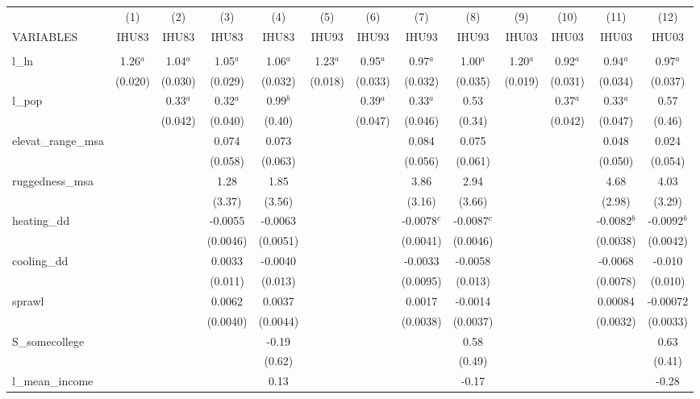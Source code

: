 \documentclass[]{article}
\begin{document}
\begin{tabular}{lcccccccccccc} \hline
 & (1) & (2) & (3) & (4) & (5) & (6) & (7) & (8) & (9) & (10) & (11) & (12) \\
VARIABLES & IHU83 & IHU83 & IHU83 & IHU83 & IHU93 & IHU93 & IHU93 & IHU93 & IHU03 & IHU03 & IHU03 & IHU03 \\ \hline
 &  &  &  &  &  &  &  &  &  &  &  &  \\
l\_ln & 1.26$^a$ & 1.04$^a$ & 1.05$^a$ & 1.06$^a$ & 1.23$^a$ & 0.95$^a$ & 0.97$^a$ & 1.00$^a$ & 1.20$^a$ & 0.92$^a$ & 0.94$^a$ & 0.97$^a$ \\
 & (0.020) & (0.030) & (0.029) & (0.032) & (0.018) & (0.033) & (0.032) & (0.035) & (0.019) & (0.031) & (0.034) & (0.037) \\
l\_pop &  & 0.33$^a$ & 0.32$^a$ & 0.99$^b$ &  & 0.39$^a$ & 0.33$^a$ & 0.53 &  & 0.37$^a$ & 0.33$^a$ & 0.57 \\
 &  & (0.042) & (0.040) & (0.40) &  & (0.047) & (0.046) & (0.34) &  & (0.042) & (0.047) & (0.46) \\
elevat\_range\_msa &  &  & 0.074 & 0.073 &  &  & 0.084 & 0.075 &  &  & 0.048 & 0.024 \\
 &  &  & (0.058) & (0.063) &  &  & (0.056) & (0.061) &  &  & (0.050) & (0.054) \\
ruggedness\_msa &  &  & 1.28 & 1.85 &  &  & 3.86 & 2.94 &  &  & 4.68 & 4.03 \\
 &  &  & (3.37) & (3.56) &  &  & (3.16) & (3.66) &  &  & (2.98) & (3.29) \\
heating\_dd &  &  & -0.0055 & -0.0063 &  &  & -0.0078$^c$ & -0.0087$^c$ &  &  & -0.0082$^b$ & -0.0092$^b$ \\
 &  &  & (0.0046) & (0.0051) &  &  & (0.0041) & (0.0046) &  &  & (0.0038) & (0.0042) \\
cooling\_dd &  &  & 0.0033 & -0.0040 &  &  & -0.0033 & -0.0058 &  &  & -0.0068 & -0.010 \\
 &  &  & (0.011) & (0.013) &  &  & (0.0095) & (0.013) &  &  & (0.0078) & (0.010) \\
sprawl &  &  & 0.0062 & 0.0037 &  &  & 0.0017 & -0.0014 &  &  & 0.00084 & -0.00072 \\
 &  &  & (0.0040) & (0.0044) &  &  & (0.0038) & (0.0037) &  &  & (0.0032) & (0.0033) \\
S\_somecollege &  &  &  & -0.19 &  &  &  & 0.58 &  &  &  & 0.63 \\
 &  &  &  & (0.62) &  &  &  & (0.49) &  &  &  & (0.41) \\
l\_mean\_income &  &  &  & 0.13 &  &  &  & -0.17 &  &  &  & -0.28 \\

\end{tabular}
\end{document}
